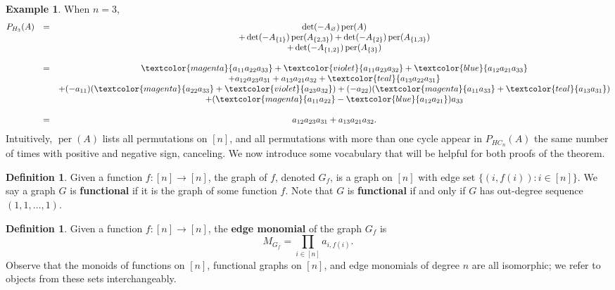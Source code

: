 \documentclass{article}
\newcommand{\per}{\operatorname{per}}
\theoremstyle{theorem}
\theoremstyle{definition}
\newtheorem{defn}[thm]{Definition}
\newtheorem{ex}[thm]{Example}
\begin{document}
\begin{ex}
    When $n=3$,
    \[
        \begin{matrix}
            P_{H_3}(A) & = & \det(-A_\varnothing)\per(A) \\
            & & +\det(-A_{\{1\}})\per(A_{\{2,3\}})+\det(-A_{\{2\}})\per(A_{\{1,3\}}) \\
            & & +\det(-A_{\{1,2\}})\per(A_{\{3\}}) \\ \\
            & = & \textcolor{magenta}{a_{11}a_{22}a_{33}}+\textcolor{violet}{a_{11}a_{23}a_{32}}+\textcolor{blue}{a_{12}a_{21}a_{33}} \\
            & & +a_{12}a_{23}a_{31}+a_{13}a_{21}a_{32}+\textcolor{teal}{a_{13}a_{22}a_{31}}\\
            & & +(-a_{11})(\textcolor{magenta}{a_{22}a_{33}}+\textcolor{violet}{a_{23}a_{32}})+(-a_{22})(\textcolor{magenta}{a_{11}a_{33}}+\textcolor{teal}{a_{13}a_{31}}) \\
            & & +(\textcolor{magenta}{a_{11}a_{22}}-\textcolor{blue}{a_{12}a_{21}})a_{33} \\ \\
            & = & a_{12}a_{23}a_{31}+a_{13}a_{21}a_{32}.
        \end{matrix}
    \]
    Intuitively, $\per(A)$ lists all permutations on $[n]$, and all permutations with more than one cycle appear in $P_{HC_n}(A)$ the same number of times with positive and negative sign, canceling. We now introduce some vocabulary that will be helpful for both proofs of the theorem.
\end{ex}

\begin{defn}
    Given a function $f:[n]\rightarrow[n]$, the graph of $f$, denoted $G_f$, is a graph on $[n]$ with edge set $\{(i,f(i)):i\in[n]\}$. We say a graph $G$ is \textbf{functional} if it is the graph of some function $f$. Note that $G$ is \textbf{functional} if and only if $G$ has out-degree sequence $(1,1,\hdots,1)$.
\end{defn}

\begin{defn}
    Given a function $f:[n]\rightarrow[n]$, the \textbf{edge monomial} of the graph $G_f$ is
    \[
        M_{G_f}=\prod_{i\in[n]}a_{i,f(i)}.
    \]
    Observe that the monoids of functions on $[n]$, functional graphs on $[n]$, and edge monomials of degree $n$ are all isomorphic; we refer to objects from these sets interchangeably.
\end{defn}
\end{document}
